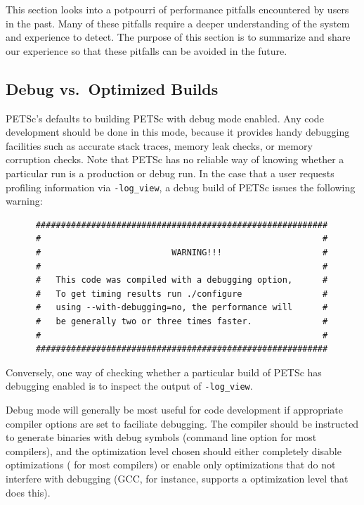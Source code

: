 {{This section looks into a potpourri of performance pitfalls encountered by users in the past.
Many of these pitfalls require a deeper understanding of the system and experience to detect.
The purpose of this section is to summarize and share our experience so that these pitfalls can be avoided in the future.

\subsection{Debug vs.\ Optimized Builds}

PETSc's  defaults to building PETSc with debug mode enabled.
Any code development should be done in this mode, because it provides handy debugging facilities such as accurate stack traces, memory leak checks, or memory corruption checks.
Note that PETSc has no reliable way of knowing whether a particular run is a production or debug run.
In the case that a user requests profiling information via \lstinline|-log_view|, a debug build of PETSc issues the following warning:
\begin{lstlisting}
      ##########################################################
      #                                                        #
      #                          WARNING!!!                    #
      #                                                        #
      #   This code was compiled with a debugging option,      #
      #   To get timing results run ./configure                #
      #   using --with-debugging=no, the performance will      #
      #   be generally two or three times faster.              #
      #                                                        #
      ##########################################################
\end{lstlisting}
Conversely, one way of checking whether a particular build of PETSc has debugging enabled is to inspect the output of \lstinline|-log_view|.

Debug mode will generally be most useful for code development if appropriate compiler options are set to faciliate debugging.
The compiler should be instructed to generate binaries with debug symbols (command line option  for most compilers),
and the optimization level chosen should either completely disable optimizations ( for most compilers) or enable only
optimizations that do not interfere with debugging (GCC, for instance, supports a  optimization level that does this).

}}
